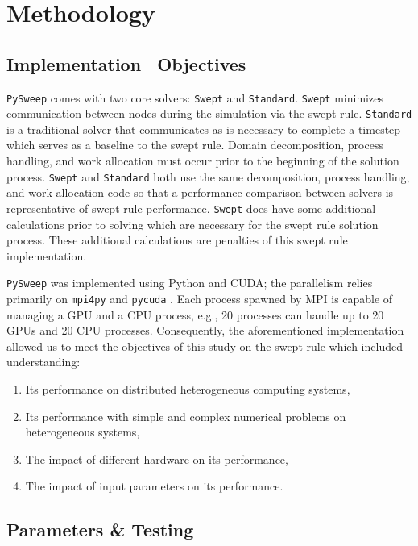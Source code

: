 \documentclass[review]{elsarticle}
\def\pysweep{\texttt{PySweep}}
\def\Swept{\texttt{Swept}}
\def\Standard{\texttt{Standard}}
\begin{document}
%
%
\section{Methodology}
\label{methods-section}
\subsection{Implementation \ Objectives}
\pysweep{} comes with two core solvers: \Swept{} and \Standard{}. \Swept{} minimizes communication between nodes during the simulation via the swept rule. \Standard{} is a traditional solver that communicates as is necessary to complete a timestep which serves as a baseline to the swept rule. Domain decomposition, process handling, and work allocation must occur prior to the beginning of the solution process. \Swept{} and \Standard{} both use the same decomposition, process handling, and work allocation code so that a performance comparison between solvers is representative of swept rule performance. \Swept{} does have some additional calculations prior to solving which are necessary for the swept rule solution process. These additional calculations are penalties of this swept rule implementation. 

\par
\pysweep{} was implemented using Python and CUDA; the parallelism relies primarily on \texttt{mpi4py} and \texttt{pycuda} \cite{DalcinMPIPython, KlocknerPyCUDAGeneration}. Each process spawned by MPI is capable of managing a GPU and a CPU process, e.g., 20 processes can handle up to 20 GPUs and 20 CPU processes. Consequently, the aforementioned implementation allowed us to meet the objectives of this study on the swept rule which included understanding:
\begin{enumerate}
    \item Its performance on distributed heterogeneous computing systems,
    \item Its performance with simple and complex numerical problems on heterogeneous systems,
    \item The impact of different hardware on its performance,
    \item The impact of input parameters on its performance.
\end{enumerate}

\subsection{Parameters \& Testing}
\label{parameters-section}
\end{document}
